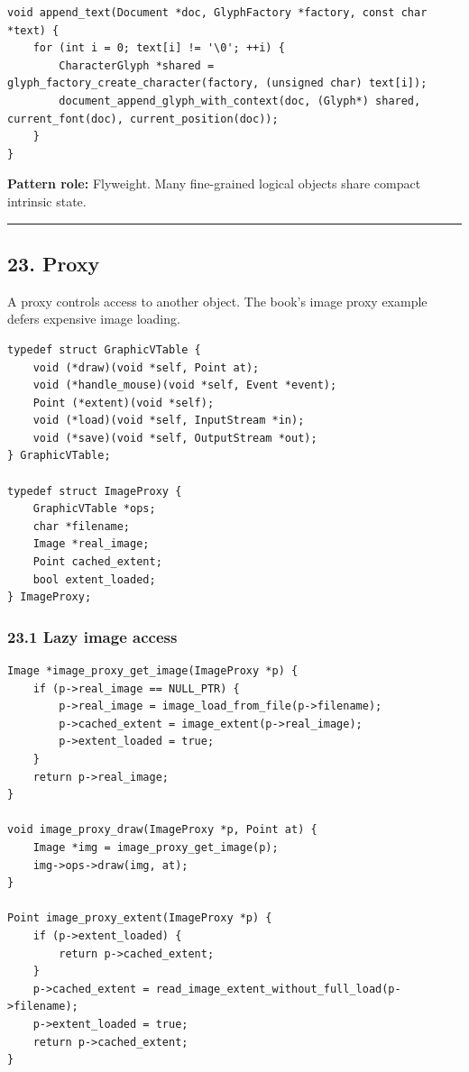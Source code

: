 \documentclass[11pt]{article}
\begin{document}
\begin{verbatim}
void append_text(Document *doc, GlyphFactory *factory, const char *text) {
    for (int i = 0; text[i] != '\0'; ++i) {
        CharacterGlyph *shared = glyph_factory_create_character(factory, (unsigned char) text[i]);
        document_append_glyph_with_context(doc, (Glyph*) shared, current_font(doc), current_position(doc));
    }
}
\end{verbatim}

\textbf{Pattern role:} Flyweight. Many fine-grained logical objects share compact intrinsic state.

\begin{center}\rule{0.5\linewidth}{0.5pt}\end{center}

\subsection{23. Proxy}\label{proxy}

A proxy controls access to another object. The book's image proxy example defers expensive image loading.

\begin{verbatim}
typedef struct GraphicVTable {
    void (*draw)(void *self, Point at);
    void (*handle_mouse)(void *self, Event *event);
    Point (*extent)(void *self);
    void (*load)(void *self, InputStream *in);
    void (*save)(void *self, OutputStream *out);
} GraphicVTable;

typedef struct ImageProxy {
    GraphicVTable *ops;
    char *filename;
    Image *real_image;
    Point cached_extent;
    bool extent_loaded;
} ImageProxy;
\end{verbatim}

\subsubsection{23.1 Lazy image access}\label{lazy-image-access}

\begin{verbatim}
Image *image_proxy_get_image(ImageProxy *p) {
    if (p->real_image == NULL_PTR) {
        p->real_image = image_load_from_file(p->filename);
        p->cached_extent = image_extent(p->real_image);
        p->extent_loaded = true;
    }
    return p->real_image;
}

void image_proxy_draw(ImageProxy *p, Point at) {
    Image *img = image_proxy_get_image(p);
    img->ops->draw(img, at);
}

Point image_proxy_extent(ImageProxy *p) {
    if (p->extent_loaded) {
        return p->cached_extent;
    }
    p->cached_extent = read_image_extent_without_full_load(p->filename);
    p->extent_loaded = true;
    return p->cached_extent;
}
\end{verbatim}
\end{document}
